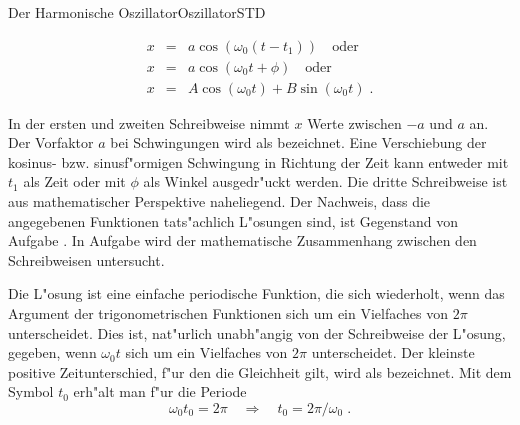 \begin{MXContent}{Der Harmonische Oszillator}{Oszillator}{STD}
\begin{MInfo}
\begin{eqnarray}
  x &=& a\cos\left(\omega_0(t-t_1)\right)\quad\mathrm{oder}\\
  x &=& a\cos(\omega_0t+\phi)\quad\mathrm{oder}\\
  x &=& A\cos\left(\omega_0t\right)+B\sin\left(\omega_0t\right)\; .
\end{eqnarray}

\end{MInfo}

In der ersten und zweiten Schreibweise nimmt $x$ Werte zwischen $-a$ und $a$ an. Der Vorfaktor $a$ bei Schwingungen wird als  bezeichnet. Eine Verschiebung der kosinus- bzw. sinusf"ormigen Schwingung in Richtung der Zeit kann entweder mit $t_1$ als Zeit oder mit $\phi$ als Winkel ausgedr"uckt werden. Die dritte Schreibweise ist aus mathematischer Perspektive naheliegend. Der Nachweis, dass die angegebenen Funktionen tats"achlich L"osungen sind, ist Gegenstand von Aufgabe 
.
In Aufgabe
wird der mathematische Zusammenhang zwischen den Schreibweisen untersucht.

Die L"osung ist eine einfache periodische Funktion, die sich wiederholt, wenn das Argument der trigonometrischen Funktionen sich um ein Vielfaches von $2\pi$ unterscheidet. Dies ist, nat"urlich unabh"angig von der Schreibweise der L"osung, gegeben, wenn $\omega_0t$ sich um ein Vielfaches von $2\pi$ unterscheidet. Der kleinste positive Zeitunterschied, f"ur den die Gleichheit gilt, wird als  bezeichnet. Mit dem Symbol $t_0$ erh"alt man f"ur die Periode 
\begin{equation}
  \omega_0t_0 = 2\pi\quad
  \Rightarrow \quad t_0=2\pi/\omega_0\; .
\end{equation}


\end{MXContent}
